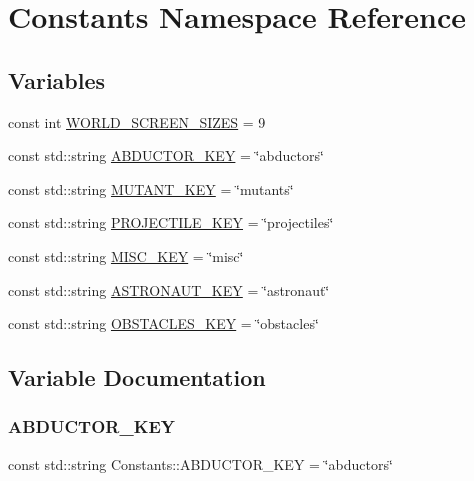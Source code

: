 \hypertarget{namespace_constants}{}\section{Constants Namespace Reference}
\label{namespace_constants}
\subsection*{Variables}
\begin{DoxyCompactItemize}
\item 
const int \hyperlink{namespace_constants_aebe280173f42e4d8992d5042f867d586}{W\+O\+R\+L\+D\+\_\+\+S\+C\+R\+E\+E\+N\+\_\+\+S\+I\+Z\+ES} = 9
\item 
const std\+::string \hyperlink{namespace_constants_a48a486618490a227e0da4511105e15b8}{A\+B\+D\+U\+C\+T\+O\+R\+\_\+\+K\+EY} = \char`\"{}abductors\char`\"{}
\item 
const std\+::string \hyperlink{namespace_constants_a135854013873b873e538f009ce8194f3}{M\+U\+T\+A\+N\+T\+\_\+\+K\+EY} = \char`\"{}mutants\char`\"{}
\item 
const std\+::string \hyperlink{namespace_constants_a844a519bb06065fbb715ab41bc02521b}{P\+R\+O\+J\+E\+C\+T\+I\+L\+E\+\_\+\+K\+EY} = \char`\"{}projectiles\char`\"{}
\item 
const std\+::string \hyperlink{namespace_constants_ae3922e95cbdf0281ae2ac5420edeca73}{M\+I\+S\+C\+\_\+\+K\+EY} = \char`\"{}misc\char`\"{}
\item 
const std\+::string \hyperlink{namespace_constants_a1fc6d1c48750c5bce513ff09a72cf655}{A\+S\+T\+R\+O\+N\+A\+U\+T\+\_\+\+K\+EY} = \char`\"{}astronaut\char`\"{}
\item 
const std\+::string \hyperlink{namespace_constants_aee2c9a41a0dbab5f02f4561c9a59aff9}{O\+B\+S\+T\+A\+C\+L\+E\+S\+\_\+\+K\+EY} = \char`\"{}obstacles\char`\"{}
\end{DoxyCompactItemize}


\subsection{Variable Documentation}
\mbox{\label{namespace_constants_a48a486618490a227e0da4511105e15b8}} 
\subsubsection{\texorpdfstring{A\+B\+D\+U\+C\+T\+O\+R\+\_\+\+K\+EY}{ABDUCTOR\_KEY}}
{\footnotesize\ttfamily const std\+::string Constants\+::\+A\+B\+D\+U\+C\+T\+O\+R\+\_\+\+K\+EY = \char`\"{}abductors\char`\"{}}

